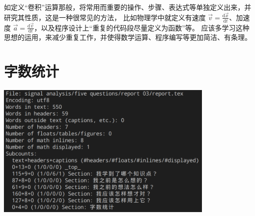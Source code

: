 \documentclass{ctexart}
\begin{document}
    如定义``卷积''运算那般，将常用而重要的操作、步骤、表达式等单独定义出来，并研究其性质，这是一种很常见的方法，
    比如物理学中就定义有速度 $\vec{v} = \frac{\mathrm{d}\vec{x}}{\mathrm{d}t}$、加速度
    $\vec{a} = \frac{\mathrm{d}\vec{v}}{\mathrm{d}t}$，以及程序设计上``重复的代码段尽量定义为函数''等。
    应该多学习这种思想的运用，来减少重复工作，并使得数学运算、程序编写等更加简洁、有条理。

    \section*{字数统计}

    \begin{center}
        \includegraphics[width=0.8\textwidth]{pics/texcount.png}
    \end{center}
\end{document}
